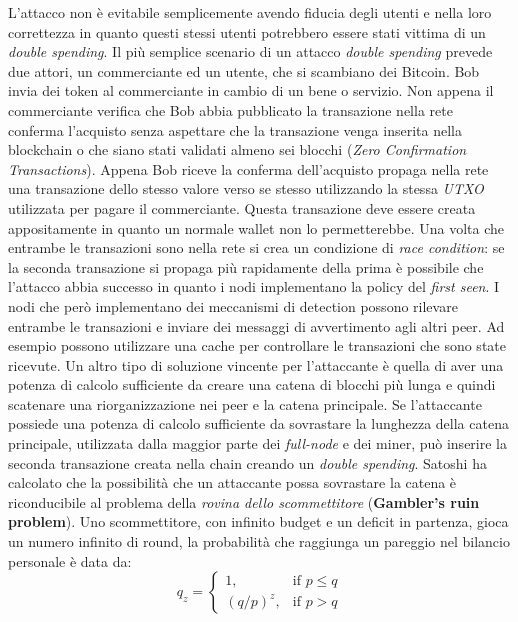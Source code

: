 L'attacco non è evitabile semplicemente avendo fiducia degli utenti e nella loro correttezza in quanto questi stessi utenti potrebbero essere stati vittima di un \textit{double spending}.\newline
Il più semplice scenario di un attacco \textit{double spending} prevede due attori, un commerciante ed un utente, che si scambiano dei Bitcoin. Bob invia dei token al commerciante in cambio di un bene o servizio. Non appena il commerciante verifica che Bob abbia pubblicato la transazione nella rete conferma l'acquisto senza aspettare che la transazione venga inserita nella blockchain o che siano stati validati almeno sei blocchi (\textit{Zero Confirmation Transactions}). Appena Bob riceve la conferma dell'acquisto propaga nella rete una transazione dello stesso valore verso se stesso utilizzando la stessa \textit{UTXO} utilizzata per pagare il commerciante. Questa transazione deve essere creata appositamente in quanto un normale wallet non lo permetterebbe.\newline
Una volta che entrambe le transazioni sono nella rete si crea un condizione di \textit{race condition}: se la seconda transazione si propaga più rapidamente della prima è possibile che l'attacco abbia successo in quanto i nodi implementano la policy del \textit{first seen}. I nodi che però implementano dei meccanismi di detection possono rilevare entrambe le transazioni e inviare dei messaggi di avvertimento agli altri peer. Ad esempio possono utilizzare una cache per controllare le transazioni che sono state ricevute.\newline
Un altro tipo di soluzione vincente per l'attaccante è quella di aver una potenza di calcolo sufficiente da creare una catena di blocchi più lunga e quindi scatenare una riorganizzazione nei peer e la catena principale. Se l'attaccante possiede una potenza di calcolo sufficiente da sovrastare la lunghezza della catena principale, utilizzata dalla maggior parte dei \textit{full-node} e dei miner, può inserire la seconda transazione creata nella chain creando un \textit{double spending}.\newline
Satoshi ha calcolato che la possibilità che un attaccante possa sovrastare la catena è riconducibile al problema della \textit{rovina dello scommettitore} (\textbf{Gambler's ruin problem}). Uno scommettitore, con infinito budget e un deficit in partenza, gioca un numero infinito di round, la probabilità che raggiunga un pareggio nel bilancio personale è data da:
\begin{equation}
    q_{z}= \begin{cases}1, & \mbox{if }p\le q \\ (q/p)^{z}, & \mbox{if } p>q\end{cases}
\end{equation}
